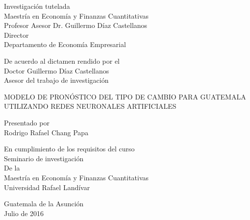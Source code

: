 \thispagestyle{empty}
\noindent
Investigación tutelada\\
Maestría en Economía y Finanzas Cuantitativas\\
Profesor Asesor Dr. Guillermo Díaz Castellanos\\
Director\\
Departamento de Economía Empresarial

\vspace{1cm}

\begin{center}
	De acuerdo al dictamen rendido por el\\
	Doctor Guillermo Díaz Castellanos\\
	Asesor del trabajo de investigación
\end{center}

\vspace{1cm}

\begin{center}
	MODELO DE PRONÓSTICO DEL TIPO DE CAMBIO PARA GUATEMALA UTILIZANDO REDES NEURONALES ARTIFICIALES
\end{center}

\vspace{1cm}

\begin{center}
	Presentado por\\
	Rodrigo Rafael Chang Papa
\end{center}

\vspace{0.5cm}

\begin{center}
	En cumplimiento de los requisitos del curso\\
	Seminario de investigación\\
	De la\\
	Maestría en Economía y Finanzas Cuantitativas\\
	Universidad Rafael Landívar\\
\end{center}

\vspace{1cm}

\begin{center}
	Guatemala de la Asunción\\
	Julio de 2016
\end{center}

